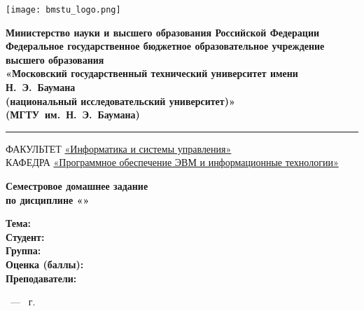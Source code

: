 \thispagestyle{empty}

\begin{titlepage}
	\noindent \begin{minipage}{0.1\textwidth}
	\texttt{[image: bmstu\_logo.png]}
	\end{minipage}
	\noindent\begin{minipage}{0.9\textwidth}\centering
		\textbf{Министерство науки и высшего образования Российской Федерации}\\
		\textbf{Федеральное государственное бюджетное образовательное учреждение высшего образования}\\
		\textbf{«Московский государственный технический университет имени Н.~Э.~Баумана}\\
		\textbf{(национальный исследовательский университет)»}\\
		\textbf{(МГТУ~им.~Н.~Э.~Баумана)}
	\end{minipage}
	
	\vspace{7pt}
	
	\noindent\rule{\textwidth}{2pt}
	
	\vspace{7pt}
	
	\noindent ФАКУЛЬТЕТ \underline{«Информатика и системы управления»} \\
	\noindent КАФЕДРА \underline{«Программное обеспечение ЭВМ и информационные технологии»}
	
	\vspace{2.5cm}
	
	\begin{center}
		\Large\textbf{Семестровое домашнее задание} \\
		\Large\textbf{по дисциплине «\subjectName»} \\
	\end{center}
	
	\vspace{2.5cm}
	
	\noindent\textbf{Тема:} \underline{\labTheme} \\
	\noindent\textbf{Студент:} \underline{\student} \\
	\noindent\textbf{Группа:} \underline{\group} \\
	\noindent\textbf{Оценка (баллы):} \underline{\hspace{0.2\textwidth}}\\
	\noindent\textbf{Преподаватели:} \underline{\teachers}\\
	
	\vspace*{\fill}
	
	\begin{center}
	\city~--- \the\year{}~г.	
	\end{center}

\end{titlepage}

\newpage

